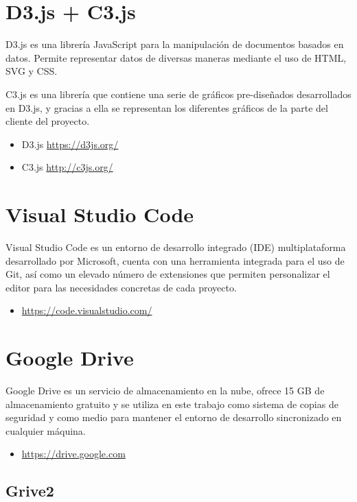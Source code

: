 \section{D3.js + C3.js}

D3.js es una librería JavaScript para la manipulación de documentos basados en datos. Permite representar datos de diversas maneras mediante el uso de HTML, SVG y CSS.

C3.js es una librería que contiene una serie de gráficos pre-diseñados desarrollados en D3.js, y gracias a ella se representan los diferentes gráficos de la parte del cliente del proyecto.
 
\begin{itemize}
	\item D3.js \url{https://d3js.org/}
	\item C3.js \url{http://c3js.org/}
\end{itemize}

\section{Visual Studio Code}

Visual Studio Code es un entorno de desarrollo integrado (IDE) multiplataforma desarrollado por Microsoft, cuenta con una herramienta integrada para el uso de Git, así como un elevado número de extensiones que permiten personalizar el editor para las necesidades concretas de cada proyecto.

\begin{itemize}
	\item \url{https://code.visualstudio.com/}
\end{itemize}

\section{Google Drive}

Google Drive es un servicio de almacenamiento en la nube, ofrece 15 GB de almacenamiento gratuito y se utiliza en este trabajo como sistema de copias de seguridad y como medio para mantener el entorno de desarrollo sincronizado en cualquier máquina.

\begin{itemize}
	\item \url{https://drive.google.com}
\end{itemize}

\subsection{Grive2}

